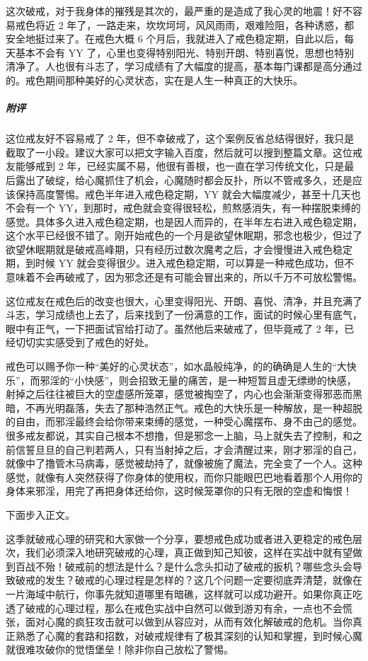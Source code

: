 \begin{case}
    这次破戒，对于我身体的摧残是其次的，最严重的是造成了我心灵的地震！好不容易戒色将近 2 年了，一路走来，坎坎坷坷，风风雨雨，艰难险阻，各种诱惑，都安全地挺过来了。在戒色大概 6 个月后，我就进入了戒色稳定期，自此以后，每天基本不会有 YY 了，心里也变得特别阳光、特别开朗、特别喜悦，思想也特别清净了。人也很有斗志了，学习成绩有了大幅度的提高，基本每门课都是高分通过的。戒色期间那种美好的心灵状态，实在是人生一种真正的大快乐。
    \subparagraph{附评} 这位戒友好不容易戒了 2 年，但不幸破戒了，这个案例反省总结得很好，我只是截取了一小段。建议大家可以把文字输入百度，然后就可以搜到整篇文章。这位戒友能够戒到 2 年，已经实属不易，他很有善根，也一直在学习传统文化，只是最后露出了破绽，给心魔抓住了机会，心魔随时都会反扑，所以不管戒多久，还是应该保持高度警惕。戒色半年进入戒色稳定期，YY 就会大幅度减少，甚至十几天也不会有一个 YY，到那时，戒色就会变得很轻松，煎熬感消失，有一种摆脱束缚的感觉。具体多久进入戒色稳定期，也是因人而异的，在半年左右进入戒色稳定期，这个水平已经很不错了。刚开始戒色的一个月是欲望休眠期，邪念也极少，但过了欲望休眠期就是破戒高峰期，只有经历过数次魔考之后，才会慢慢进入戒色稳定期，到时候 YY 就会变得很少。进入戒色稳定期，可以算是一种戒色成功，但不意味着不会再破戒了，因为邪念还是有可能会冒出来的，所以千万不可放松警惕。

    这位戒友在戒色后的改变也很大，心里变得阳光、开朗、喜悦、清净，并且充满了斗志，学习成绩也上去了，后来找到了一份满意的工作，面试的时候心里有底气，眼中有正气，一下把面试官给打动了。虽然他后来破戒了，但毕竟戒了 2 年，已经切切实实感受到了戒色的好处。

    戒色可以赐予你一种“美好的心灵状态”，如水晶般纯净，的的确确是人生的“大快乐”，而邪淫的“小快感”，则会招致无量的痛苦，是一种短暂且虚无缥缈的快感，射掉之后往往被巨大的空虚感所笼罩，感觉被掏空了，内心也会渐渐变得邪恶而黑暗，不再光明磊落，失去了那种浩然正气。戒色的大快乐是一种解放，是一种超脱的自由，而邪淫最终会给你带来束缚的感觉，一种受心魔摆布、身不由己的感觉。很多戒友都说，其实自己根本不想撸，但是邪念一上脑，马上就失去了控制，和之前信誓旦旦的自己判若两人，只有当射掉之后，才会清醒过来，刚才邪淫的自己，就像中了撸管木马病毒，感觉被劫持了，就像被施了魔法，完全变了一个人。这种感觉，就像有人突然获得了你身体的使用权，而你只能眼巴巴地看着那个人用你的身体来邪淫，用完了再把身体还给你，这时候笼罩你的只有无限的空虚和悔恨！
\end{case}

下面步入正文。

这季就破戒心理的研究和大家做一个分享，要想戒色成功或者进入更稳定的戒色层次，我们必须深入地研究破戒的心理，真正做到知己知彼，这样在实战中就有望做到百战不殆！破戒前的想法是什么？是什么念头扣动了破戒的扳机？哪些念头会导致破戒的发生？破戒的心理过程是怎样的？这几个问题一定要彻底弄清楚，就像在一片海域中航行，你事先就知道哪里有暗礁，这样就可以成功避开。如果你真正吃透了破戒的心理过程，那么在戒色实战中自然可以做到游刃有余，一点也不会慌张，面对心魔的疯狂攻击就可以做到从容应对，从而有效化解破戒的危机。当你真正熟悉了心魔的套路和招数，对破戒规律有了极其深刻的认知和掌握，到时候心魔就很难攻破你的觉悟堡垒！除非你自己放松了警惕。

